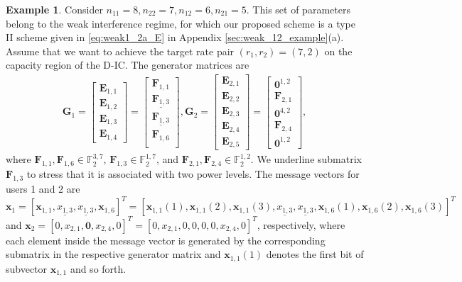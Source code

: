 \documentclass[12pt, draftclsnofoot, onecolumn]{IEEEtran}
\theoremstyle{definition}
\newtheorem{example}{Example}
\begin{document}
\begin{example}\label{example_new}
Consider $n_{11}=8,n_{22}=7,n_{12}=6,n_{21} = 5$. This set of parameters belong to the weak interference regime, for which our proposed scheme is a type II scheme given in \eqref{eq:weak1_2a_E} in Appendix \ref{sec:weak_12_example}(a). Assume that we want to achieve the target rate pair $(r_1,r_2) = (7,2)$ on the capacity region of the D-IC. The generator matrices are
\begin{align}
\boldsymbol{G}_1=\begin{bmatrix}
\boldsymbol{E}_{1,1}\\
\boldsymbol{E}_{1,2}\\
\boldsymbol{E}_{1,3}\\
\boldsymbol{E}_{1,4}
\end{bmatrix}=
\begin{bmatrix}
\boldsymbol{F}_{1,1}\\
\underline{\boldsymbol{F}_{1,3}}\\
\underline{\boldsymbol{F}_{1,3}}\\
\boldsymbol{F}_{1,6}\\
\end{bmatrix},
\boldsymbol{G}_2=\begin{bmatrix}
\boldsymbol{E}_{2,1}\\
\boldsymbol{E}_{2,2}\\
\boldsymbol{E}_{2,3}\\
\boldsymbol{E}_{2,4}\\
\boldsymbol{E}_{2,5}
\end{bmatrix}= \begin{bmatrix}
\boldsymbol{0}^{1,2} \\
\boldsymbol{F}_{2,1}\\
\boldsymbol{0}^{4,2}\\
\boldsymbol{F}_{2,4}\\
\boldsymbol{0}^{1,2}
\end{bmatrix},
\end{align}
where $\boldsymbol{F}_{1,1},\boldsymbol{F}_{1,6}\in\mathbb{F}_2^{3,7}$, $\boldsymbol{F}_{1,3}\in\mathbb{F}_2^{1,7}$, and $\boldsymbol{F}_{2,1},\boldsymbol{F}_{2,4}\in\mathbb{F}_2^{1,2}$. We underline submatrix $\boldsymbol{F}_{1,3}$ to stress that it is associated with two power levels. The message vectors for users 1 and 2 are $\boldsymbol{x}_1=[\boldsymbol{x}_{1,1},\underline{x_{1,3}},\underline{x_{1,3}},\boldsymbol{x}_{1,6}]^T=[\boldsymbol{x}_{1,1}(1),\boldsymbol{x}_{1,1}(2),\boldsymbol{x}_{1,1}(3),\underline{x_{1,3}},\underline{x_{1,3}},\boldsymbol{x}_{1,6}(1),\boldsymbol{x}_{1,6}(2),\boldsymbol{x}_{1,6}(3)]^T$ and $\boldsymbol{x}_2=[0,x_{2,1},\boldsymbol{0},x_{2,4},0]^T=[0,x_{2,1},0,0,0,0,x_{2,4},0]^T$, respectively, where each element inside the message vector is generated by the corresponding submatrix in the respective generator matrix and $\boldsymbol{x}_{1,1}(1)$ denotes the first bit of subvector $\boldsymbol{x}_{1,1}$ and so forth.


\end{example}
\end{document}
